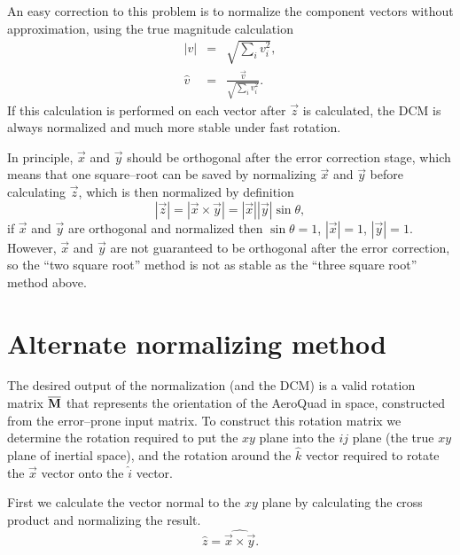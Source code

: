 \documentclass{article}
\def\matrix#1{\overline{\bf{#1}}}
\begin{document}
An easy correction to this problem is to normalize the component vectors without approximation, using the true magnitude calculation
\begin{eqnarray}
	\left|v\right| &=& \sqrt{\sum_i v_i^2},\\
	\hat{v} &=& \frac{\vec{v}}{\sqrt{\sum_i v_i^2}}.
\end{eqnarray}
If this calculation is performed on each vector after $\vec{z}$ is calculated, the DCM is always normalized and much more stable under fast rotation.

In principle, $\vec{x}$ and $\vec{y}$ should be orthogonal after the error correction stage, which means that one square--root can be saved by normalizing $\vec{x}$ and $\vec{y}$ before calculating $\vec{z}$, which is then normalized by definition
\begin{equation}
	\left|\vec{z}\right| = \left|\vec{x} \times \vec{y}\right| = \left|\vec{x}\right| \left|\vec{y}\right| \sin\theta,
\end{equation}
if $\vec{x}$ and $\vec{y}$ are orthogonal and normalized then $\sin\theta=1$, $\left|\vec{x}\right|=1$, $\left|\vec{y}\right|=1$. However,  $\vec{x}$ and $\vec{y}$ are not guaranteed to be orthogonal after the error correction, so the ``two square root'' method is not as stable as the ``three square root'' method above.

\section{Alternate normalizing method}
The desired output of the normalization (and the DCM) is a valid rotation matrix $\matrix{M}$ that represents the orientation of the AeroQuad in space, constructed from the error--prone input matrix. To construct this rotation matrix we determine the rotation required to put the $xy$ plane into the $ij$ plane (the true $xy$ plane of inertial space), and the rotation around the $\hat{k}$ vector required to rotate the $\vec{x}$ vector onto the $\hat{i}$ vector.

First we calculate the vector normal to the $xy$ plane by calculating the cross product and normalizing the result.
\begin{equation}
	\hat{z} = \widehat{\vec{x}\times\vec{y}}.
\end{equation}
\end{document}
